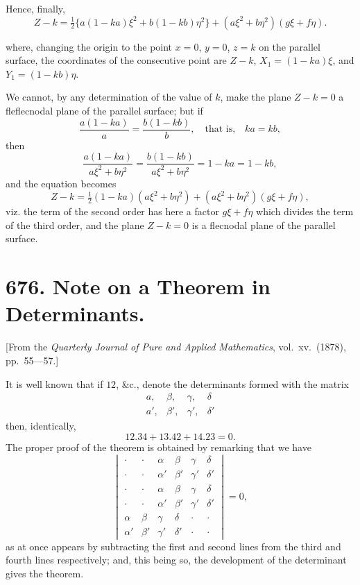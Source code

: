 \documentclass[11pt,a4paper]{book}
\begin{document}
Hence, finally,
\[
Z - k = \tfrac{1}{2}\{a(1 - ka)\xi^2 + b(1 - kb)\eta^2\} + (a\xi^2 + b\eta^2)(g\xi + f\eta).
\]

where, changing the origin to the point $x = 0$, $y = 0$, $z = k$ on the parallel surface, the coordinates of the consecutive point are $Z - k$, $X_1 = (1 - ka)\xi$, and $Y_1 = (1 - kb)\eta$.

We cannot, by any determination of the value of $k$, make the plane $Z - k = 0$ a fleflecnodal plane of the parallel surface; but if
\[
\frac{a(1 - ka)}{a} = \frac{b(1 - kb)}{b}, \quad \text{that is,} \quad ka = kb,
\]
then
\[
\frac{a(1 - ka)}{a\xi^2 + b\eta^2} = \frac{b(1 - kb)}{a\xi^2 + b\eta^2} = 1 - ka = 1 - kb,
\]
and the equation becomes
\[
Z - k = \tfrac{1}{2}(1 - ka)(a\xi^2 + b\eta^2) + (a\xi^2 + b\eta^2)(g\xi + f\eta),
\]
viz. the term of the second order has here a factor $g\xi + f\eta$ which divides the term of the third order, and the plane $Z - k = 0$ is a flecnodal plane of the parallel surface.

\newpage

\section*{676. Note on a Theorem in Determinants.}

[From the \textit{Quarterly Journal of Pure and Applied Mathematics}, vol.\ xv.\ (1878), pp.\ 55---57.]

It is well known that if $12$, \&c., denote the determinants formed with the matrix
\[
\begin{matrix}
a, & \beta, & \gamma, & \delta \\
a', & \beta', & \gamma', & \delta'
\end{matrix}
\]
then, identically,
\[
12.34 + 13.42 + 14.23 = 0.
\]
The proper proof of the theorem is obtained by remarking that we have
\[
\begin{vmatrix}
\cdot & \cdot & \alpha & \beta & \gamma & \delta \\
\cdot & \cdot & \alpha' & \beta' & \gamma' & \delta' \\
\cdot & \cdot & \alpha & \beta & \gamma & \delta \\
\cdot & \cdot & \alpha' & \beta' & \gamma' & \delta' \\
\alpha & \beta & \gamma & \delta & \cdot & \cdot \\
\alpha' & \beta' & \gamma' & \delta' & \cdot & \cdot
\end{vmatrix} = 0,
\]
as at once appears by subtracting the first and second lines from the third and fourth lines respectively; and, this being so, the development of the determinant gives the theorem.
\end{document}
